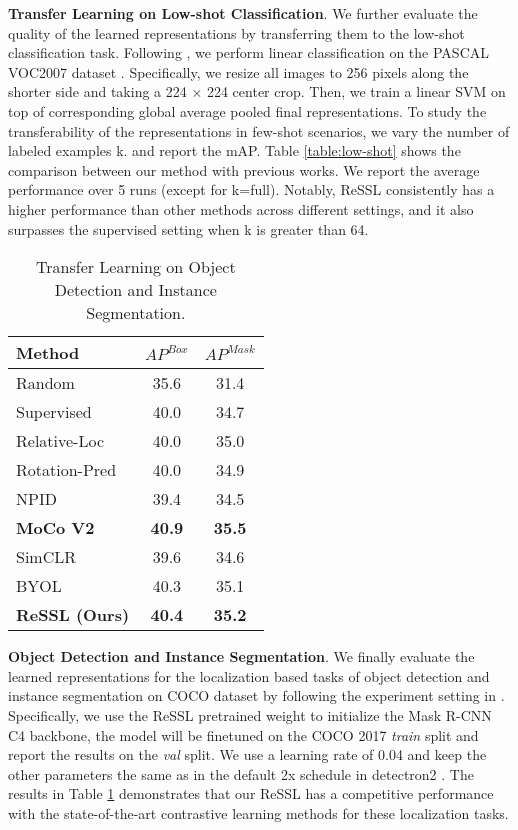 \documentclass{article}
\newcommand{\<}{\left\langle}
\renewcommand{\>}{\right\rangle}
\begin{document}
\textbf{Transfer Learning on Low-shot Classification}. 
We further evaluate the quality of the learned representations by transferring them to the low-shot classification task. Following \cite{PCL}, we perform linear classification on the PASCAL VOC2007 dataset \cite{pascal-voc-2007}. Specifically, we resize all images to 256 pixels along the shorter side and taking a 224 × 224 center crop. Then, we train a linear SVM on top of corresponding global average pooled final representations. To study the transferability of the representations in few-shot scenarios, we vary the number of labeled examples k. and report the mAP. Table \ref{table:low-shot} shows the comparison between our method with previous works. We report the average performance over 5 runs (except for k=full). Notably, ReSSL consistently has a higher performance than other methods across different settings, and it also surpasses the supervised setting when k is greater than 64.




\renewcommand\arraystretch{1.0}
\begin{table}[h]
 \centering
 \setlength\tabcolsep{10pt}
 \vspace{-5pt}
 \caption{Transfer Learning on Object Detection and Instance Segmentation.}
 \vspace{-10pt}
 \label{table:detection}
\begin{tabular}{l  c  c} 
\toprule 
Method & $AP^{Box}$ & $AP^{Mask}$ \\
\hline
Random & 35.6 & 31.4 \\
Supervised & 40.0 & 34.7 \\  \hline
Relative-Loc \cite{patch_prediction} & 40.0 & 35.0 \\
Rotation-Pred \cite{rotation_selfsup} & 40.0 & 34.9 \\
NPID \cite{instance_discrimination} & 39.4 & 34.5 \\
\textbf{MoCo V2} \cite{mocov2} & \textbf{40.9}  & \textbf{35.5}  \\
SimCLR \cite{simclr} & 39.6 & 34.6 \\
BYOL \cite{byol} & 40.3 & 35.1 \\
\textbf{ReSSL (Ours)} & \textbf{40.4}  & \textbf{35.2} \\
\bottomrule
\end{tabular}
\end{table}


\textbf{Object Detection and Instance Segmentation}.
We finally evaluate the learned representations for the localization based tasks of object detection and instance segmentation on COCO \cite{coco} dataset by following the experiment setting in \cite{moco}. Specifically, we use the ReSSL pretrained weight to initialize the Mask R-CNN \cite{maskrcnn} C4 backbone, the model will be finetuned on the COCO 2017 \emph{train} split and report the results on the \emph{val} split. We use a learning rate of 0.04 and keep the other parameters the same as in the  default 2x schedule in detectron2 \cite{detectron2}. The results in Table \ref{table:detection} demonstrates that our ReSSL has a competitive performance with the state-of-the-art contrastive learning methods for these localization tasks.
\end{document}
